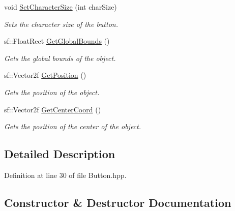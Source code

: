 \begin{DoxyCompactItemize}
void \mbox{\hyperlink{class_game_objects_1_1_button_abdbfc955cf954a59f8ac319954dcd25c}{Set\+Character\+Size}} (int char\+Size)
\begin{DoxyCompactList}\small\item\em Sets the character size of the button. \end{DoxyCompactList}\item 
sf\+::\+Float\+Rect \mbox{\hyperlink{class_game_objects_1_1_button_a73b104836302e0c11afa3ab0ed07a4f5}{Get\+Global\+Bounds}} ()
\begin{DoxyCompactList}\small\item\em Gets the global bounds of the object. \end{DoxyCompactList}\item 
sf\+::\+Vector2f \mbox{\hyperlink{class_game_objects_1_1_button_afd9cb38464fbbd3dd97c8df38ab94779}{Get\+Position}} ()
\begin{DoxyCompactList}\small\item\em Gets the position of the object. \end{DoxyCompactList}\item 
sf\+::\+Vector2f \mbox{\hyperlink{class_game_objects_1_1_button_a1cc1e657bb1d813976caf107a48d6cb5}{Get\+Center\+Coord}} ()
\begin{DoxyCompactList}\small\item\em Gets the position of the center of the object. \end{DoxyCompactList}\end{DoxyCompactItemize}


\subsection{Detailed Description}


Definition at line 30 of file Button.\+hpp.



\subsection{Constructor \& Destructor Documentation}
\mbox{\label{class_game_objects_1_1_button_a8fdd102aa18578cfed540502e2c25a37}} 
